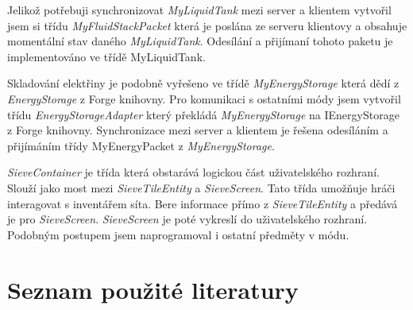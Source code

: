 \documentclass[FM,Proj,bw]{tulthesis}
\begin{document}
\par Jelikož potřebuji synchronizovat \textit{MyLiquidTank} mezi server a klientem vytvořil jsem si třídu  \textit{MyFluidStackPacket} která je poslána ze serveru klientovy a obsahuje momentální stav daného \textit{MyLiquidTank}. Odesílání a přijímaní tohoto paketu je implementováno ve třídě MyLiquidTank.
\par Skladování elektřiny je podobně vyřešeno ve třídě \textit{MyEnergyStorage} která dědí z \textit{EnergyStorage} z Forge knihovny. Pro komunikaci s ostatními módy jsem vytvořil třídu \textit{EnergyStorageAdapter} který překládá \textit{MyEnergyStorage} na IEnergyStorage z Forge knihovny. Synchronizace mezi server a klientem je řešena odesíláním a přijímáním třídy MyEnergyPacket z  \textit{MyEnergyStorage}.
\begin{comment}
\par    Chtěl jsem v tile entity skladovat tekutity tak jsem si vytvořil novou třídu  \textit{MyLiquidTank} která dědila ze třídy \textit{FluidTank}. Implementoval jsem všechny její metody a přidal pár vlastních abych zabránil duplikacy kódu. Objekt této třídy jsem poté přidal do své\textit{ tile entity}. Pro práci s ním jsem vytvořil interface \textit{IMyLiquidTankTile}. 
\end{comment}
\begin{comment}
 \par   Poté jsem to samé udělal pro \textit{MyEnergyStorage}. Vytvořil jsem  \textit{IMYEnergyStorageTile} pro \textit{tile entity} obsahující  \textit{MyEnergyStorage}.  Vytvořil jsem \textit{MyEnergyPacket} pro synchronizaci klienta a servru. Vytvořil jsem \textit{EnergyStorageAdapter} který překládá \textit{MyEnergyStorage} na IEnergyStorage z Forge pro komunikaci s ostatními módy.
 \end{comment}
 \begin{comment}
        \par    Poté jsem měl\textit{ tile entity} která je schopná skladovat tekutiny, elekřinu a předměty
\end{comment}
\par \textit{SieveContainer} je třída která obstarává logickou část uživatelského rozhraní. Slouží jako most mezi \textit{SieveTileEntity} a \textit{SieveScreen}. Tato třída umožňuje hráči interagovat s inventářem síta. Bere informace přímo z \textit{SieveTileEntity} a předává je pro \textit{SieveScreen}.  \textit{SieveScreen} je poté vykreslí do uživatelského rozhraní.
Podobným postupem jsem naprogramoval i ostatní předměty v módu.


\chapter*{Seznam použité literatury}
\printbibliography[heading=none]
\end{document}
